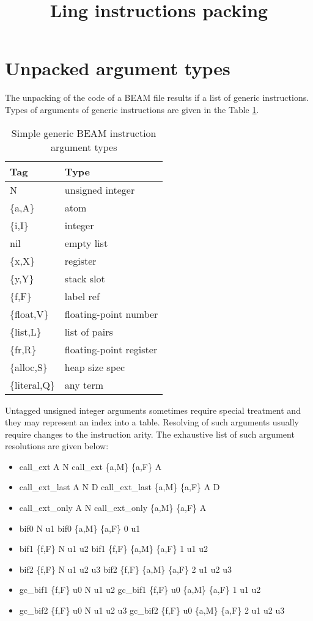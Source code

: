 \documentclass{article}
\title{Ling instructions packing}
\begin{document}
\maketitle

\section*{Unpacked argument types}

The unpacking of the code of a BEAM file results if a list of generic
instructions. Types of arguments of generic instructions are given in the Table
\ref{tab:gentypes}.

\begin{table}[!ht]
\begin{tabular}{ll}
Tag & Type \\
\hline
N & unsigned integer \\
\{a,A\} & atom \\
\{i,I\} & integer \\
nil & empty list \\
\{x,X\} & register \\
\{y,Y\} & stack slot \\
\{f,F\} & label ref \\
\{float,V\} & floating-point number \\
\{list,L\} & list of pairs \\
\{fr,R\} & floating-point register \\
\{alloc,S\} & heap size spec \\
\{literal,Q\} & any term \\
\hline
\end{tabular}
\caption{Simple generic BEAM instruction argument types\label{tab:gentypes}}
\end{table}

Untagged unsigned integer arguments sometimes require special treatment and they
may represent an index into a table. Resolving of such arguments usually require
changes to the instruction arity. The exhaustive list of such argument
resolutions are given below$:$

\begin{itemize}
\item call\_ext A N \textrightarrow{} call\_ext \{a,M\} \{a,F\} A
\item call\_ext\_last A N D \textrightarrow{} call\_ext\_last \{a,M\} \{a,F\} A D
\item call\_ext\_only A N \textrightarrow{} call\_ext\_only \{a,M\} \{a,F\} A
\item bif0 N u1 \textrightarrow{} bif0 \{a,M\} \{a,F\} 0 u1
\item bif1 \{f,F\} N u1 u2 \textrightarrow{} bif1 \{f,F\} \{a,M\} \{a,F\} 1 u1 u2
\item bif2 \{f,F\} N u1 u2 u3 \textrightarrow{} bif2 \{f,F\} \{a,M\} \{a,F\} 2 u1 u2 u3
\item gc\_bif1 \{f,F\} u0 N u1 u2 \textrightarrow{} gc\_bif1 \{f,F\} u0 \{a,M\} \{a,F\} 1 u1 u2
\item gc\_bif2 \{f,F\} u0 N u1 u2 u3 \textrightarrow{} gc\_bif2 \{f,F\} u0 \{a,M\} \{a,F\} 2 u1 u2 u3
\end{itemize}
\end{document}
